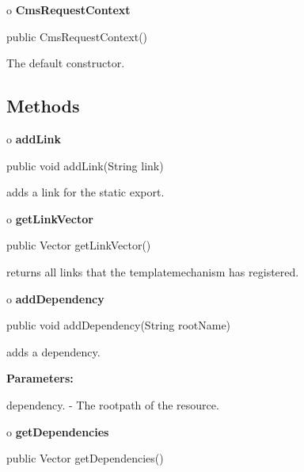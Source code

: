 o {\bf CmsRequestContext} 

\begin{PRE}
 public CmsRequestContext()
\end{PRE}

\begin{description}
\htmlDD The default constructor. 

\end{description}

\subsection*{  Methods }

o {\bf addLink} 

\begin{PRE}
 public void addLink(String link)
\end{PRE}

\begin{description}
\htmlDD adds a link for the static export. 

\end{description}

o {\bf getLinkVector} 

\begin{PRE}
 public Vector getLinkVector()
\end{PRE}

\begin{description}
\htmlDD returns all links that the templatemechanism has registered. 

\end{description}

o {\bf addDependency} 

\begin{PRE}
 public void addDependency(String rootName)
\end{PRE}

\begin{description}
\htmlDD adds a dependency. 

\begin{description}
\item {\bf Parameters:}  

dependency. - The rootpath of the resource.  
\end{description}

\end{description}

o {\bf getDependencies} 

\begin{PRE}
 public Vector getDependencies()
\end{PRE}

